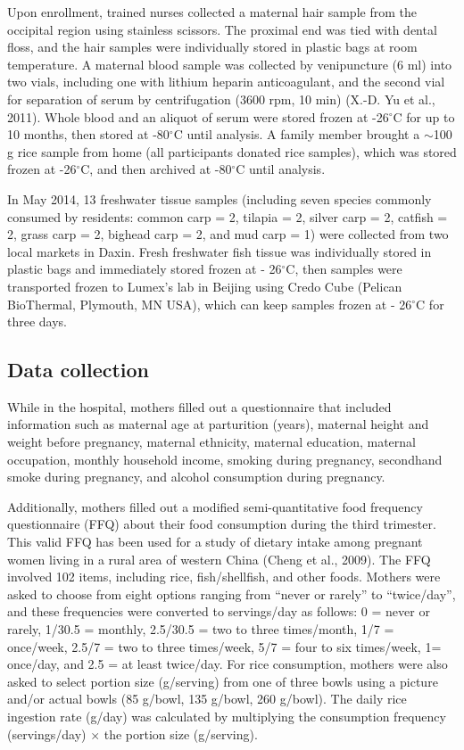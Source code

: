 Upon enrollment, trained nurses collected a maternal hair sample from the occipital region using stainless scissors. The proximal end was tied with dental floss, and the hair samples were individually stored in plastic bags at room temperature. A maternal blood sample was collected by venipuncture (6 ml) into two vials, including one with lithium heparin anticoagulant, and the second vial for separation of serum by centrifugation (3600 rpm, 10 min) (X.-D. Yu et al., 2011). Whole blood and an aliquot of serum were stored frozen at -26\({^\circ}\)C for up to 10 months, then stored at -80\({^\circ}\)C until analysis. A family member brought a \({\sim}\)100 g rice sample from home (all participants donated rice samples), which was stored frozen at -26\({^\circ}\)C, and then archived at -80\({^\circ}\)C until analysis. 

In May 2014, 13 freshwater tissue samples (including seven species commonly consumed by residents: common carp = 2, tilapia = 2, silver carp = 2, catfish = 2, grass carp = 2, bighead carp = 2, and mud carp = 1) were collected from two local markets in Daxin. Fresh freshwater fish tissue was individually stored in plastic bags and immediately stored frozen at - 26\({^\circ}\)C, then samples were transported frozen to Lumex's lab in Beijing using Credo Cube (Pelican BioThermal, Plymouth, MN USA), which can keep samples frozen at - 26\({^\circ}\)C for three days.

\subsection{Data collection}

While in the hospital, mothers filled out a questionnaire that included information such as maternal age at parturition (years), maternal height and weight before pregnancy, maternal ethnicity, maternal education, maternal occupation, monthly household income, smoking during pregnancy, secondhand smoke during pregnancy, and alcohol consumption during pregnancy. 

Additionally, mothers filled out a modified semi-quantitative food frequency questionnaire (FFQ) about their food consumption during the third trimester. This valid FFQ has been used for a study of dietary intake among pregnant women living in a rural area of western China (Cheng et al., 2009). The FFQ involved 102 items, including rice, fish/shellfish, and other foods. Mothers were asked to choose from eight options ranging from ``never or rarely'' to ``twice/day'', and these frequencies were converted to servings/day as follows: 0 = never or rarely, 1/30.5 = monthly, 2.5/30.5 = two to three times/month, 1/7 = once/week, 2.5/7 = two to three times/week, 5/7 = four to six times/week, 1= once/day, and 2.5 = at least twice/day. For rice consumption, mothers were also asked to select portion size (g/serving) from one of three bowls using a picture and/or actual bowls (85 g/bowl, 135 g/bowl, 260 g/bowl). The daily rice ingestion rate (g/day) was calculated by multiplying the consumption frequency (servings/day) \({\times}\) the portion size (g/serving). 

